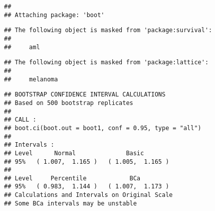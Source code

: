 \documentclass[
]{article}
\newenvironment{Shaded}{\begin{snugshade}}{\end{snugshade}}
\newcommand{\CommentTok}[1]{\textcolor[rgb]{0.56,0.35,0.01}{\textit{#1}}}
\newcommand{\ControlFlowTok}[1]{\textcolor[rgb]{0.13,0.29,0.53}{\textbf{#1}}}
\newcommand{\DataTypeTok}[1]{\textcolor[rgb]{0.13,0.29,0.53}{#1}}
\newcommand{\DecValTok}[1]{\textcolor[rgb]{0.00,0.00,0.81}{#1}}
\newcommand{\FloatTok}[1]{\textcolor[rgb]{0.00,0.00,0.81}{#1}}
\newcommand{\KeywordTok}[1]{\textcolor[rgb]{0.13,0.29,0.53}{\textbf{#1}}}
\newcommand{\NormalTok}[1]{#1}
\newcommand{\OperatorTok}[1]{\textcolor[rgb]{0.81,0.36,0.00}{\textbf{#1}}}
\newcommand{\StringTok}[1]{\textcolor[rgb]{0.31,0.60,0.02}{#1}}
\begin{document}
\begin{verbatim}
## 
## Attaching package: 'boot'
\end{verbatim}

\begin{verbatim}
## The following object is masked from 'package:survival':
## 
##     aml
\end{verbatim}

\begin{verbatim}
## The following object is masked from 'package:lattice':
## 
##     melanoma
\end{verbatim}

\begin{Shaded}
\end{Shaded}

\begin{verbatim}
## BOOTSTRAP CONFIDENCE INTERVAL CALCULATIONS
## Based on 500 bootstrap replicates
## 
## CALL : 
## boot.ci(boot.out = boot1, conf = 0.95, type = "all")
## 
## Intervals : 
## Level      Normal              Basic         
## 95%   ( 1.007,  1.165 )   ( 1.005,  1.165 )  
## 
## Level     Percentile            BCa          
## 95%   ( 0.983,  1.144 )   ( 1.007,  1.173 )  
## Calculations and Intervals on Original Scale
## Some BCa intervals may be unstable
\end{verbatim}

\begin{Shaded}
\end{Shaded}
\end{document}
